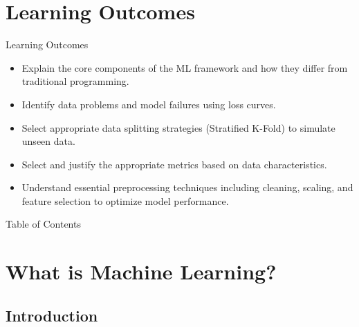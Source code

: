 \section{Learning Outcomes}

\begin{frame}{Learning Outcomes}
    \begin{itemize}
        \item Explain the core components of the ML framework and how they differ from traditional programming.

        \item Identify data problems and model failures using loss curves.
        
        \item Select appropriate data splitting strategies (Stratified K-Fold) to simulate unseen data.
        
        \item Select and justify the appropriate metrics based on data characteristics.
        
        \item Understand essential preprocessing techniques including cleaning, scaling, and feature selection to optimize model performance.
    \end{itemize}
\end{frame}

\begin{frame}[allowframebreaks]{Table of Contents}
    \tableofcontents
\end{frame}


\section{What is Machine Learning?}

\subsection{Introduction}
